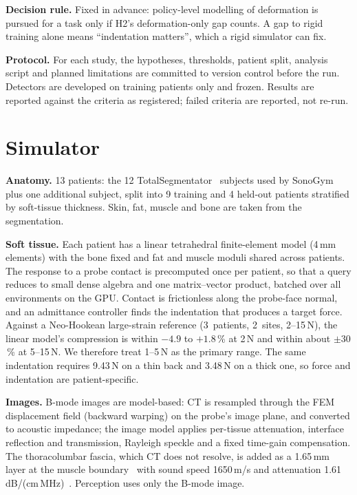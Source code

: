 \documentclass[conference]{IEEEtran}
\begin{document}
\textbf{Decision rule.} Fixed in advance: policy-level modelling of deformation is pursued for a task only if H2's
deformation-only gap counts. A gap to rigid training alone means ``indentation matters'', which a rigid simulator can
fix.

\textbf{Protocol.} For each study, the hypotheses, thresholds, patient split, analysis script and planned limitations
are committed to version control before the run. Detectors are developed on training patients only and frozen. Results
are reported against the criteria as registered; failed criteria are reported, not re-run.

\section{Simulator}
\label{sec:sim}

\textbf{Anatomy.} 13 patients: the 12 TotalSegmentator~\cite{wasserthal2023totalsegmentator} subjects used by
SonoGym plus one additional subject, split into 9 training and 4 held-out patients stratified by soft-tissue thickness.
Skin, fat, muscle and bone are taken from the segmentation.

\textbf{Soft tissue.} Each patient has a linear tetrahedral finite-element model (4\,mm elements) with the bone fixed
and fat and muscle moduli shared across patients. The response to a probe contact is precomputed once per patient,
so that a query reduces to small dense algebra and one matrix--vector product, batched over all environments on the
GPU. Contact is frictionless along the probe-face normal, and an admittance controller finds the indentation that
produces a target force. Against a Neo-Hookean large-strain reference (3~patients, 2~sites, 2--15\,N), the linear
model's compression is within $-4.9$ to $+1.8$\,\% at 2\,N and within about $\pm 30$\,\% at 5--15\,N. We therefore
treat 1--5\,N as the primary range. The same indentation requires 9.43\,N on a thin back and 3.48\,N on a thick
one, so force and indentation are patient-specific.

\textbf{Images.} B-mode images are model-based: CT is resampled through the FEM displacement field (backward warping)
on the probe's image plane, and converted to acoustic impedance; the image model applies per-tissue attenuation,
interface reflection and transmission, Rayleigh speckle and a fixed time-gain compensation. The thoracolumbar fascia,
which CT does not resolve, is added as a 1.65\,mm layer at the muscle boundary~\cite{pirri2023fascia} with sound speed
1650\,m/s and attenuation 1.61\,dB/(cm\,MHz)~\cite{miles1996tendon}. Perception uses only the B-mode image.
\end{document}
